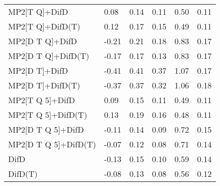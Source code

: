 \begin{table}
\begin{tabular}{l l l l l l }
    MP2[T Q]+DifD & 0.08 & 0.14 & 0.11 & 0.50 & 0.11 \\ 
    MP2[T Q]+DifD(T) & 0.12 & 0.17 & 0.15 & 0.49 & 0.11 \\ 
    MP2[D T Q]+DifD & -0.21 & 0.21 & 0.18 & 0.83 & 0.17 \\ 
    MP2[D T Q]+DifD(T) & -0.17 & 0.17 & 0.13 & 0.83 & 0.17 \\ 
    MP2[D T]+DifD & -0.41 & 0.41 & 0.37 & 1.07 & 0.17 \\ 
    MP2[D T]+DifD(T) & -0.37 & 0.37 & 0.32 & 1.06 & 0.18 \\ 
    MP2[T Q 5]+DifD & 0.09 & 0.15 & 0.11 & 0.49 & 0.11 \\ 
    MP2[T Q 5]+DifD(T) & 0.13 & 0.19 & 0.16 & 0.48 & 0.11 \\ 
    MP2[D T Q 5]+DifD & -0.11 & 0.14 & 0.09 & 0.72 & 0.15 \\ 
    MP2[D T Q 5]+DifD(T) & -0.07 & 0.12 & 0.08 & 0.71 & 0.14 \\ 
    DifD & -0.13 & 0.15 & 0.10 & 0.59 & 0.14 \\ 
    DifD(T) & -0.08 & 0.13 & 0.08 & 0.56 & 0.12 \\ 
    \bottomrule
  \end{tabular}
\end{table}
